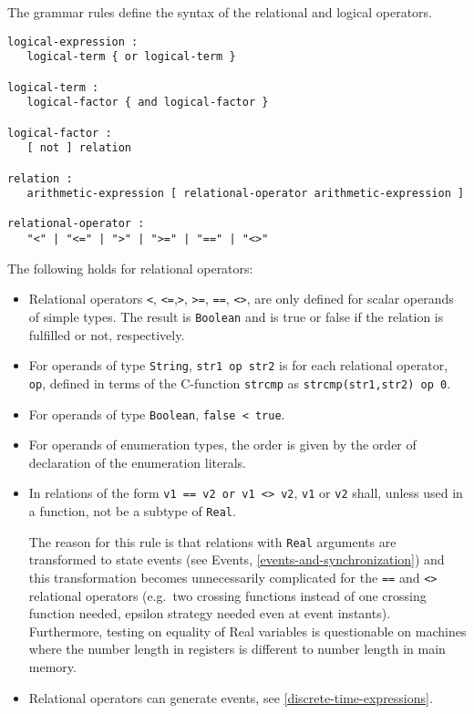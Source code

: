 The grammar rules define the syntax of the relational and logical
operators.

\begin{lstlisting}[language=grammar]
logical-expression :
   logical-term { or logical-term }

logical-term :
   logical-factor { and logical-factor }

logical-factor :
   [ not ] relation

relation :
   arithmetic-expression [ relational-operator arithmetic-expression ]

relational-operator :
   "<" | "<=" | ">" | ">=" | "==" | "<>"
\end{lstlisting}

The following holds for relational operators:
\begin{itemize}
\item
  Relational operators \lstinline!<!, \lstinline!<=!,\lstinline!>!,
\lstinline!>=!, \lstinline!==!, \lstinline!<>!, are only defined for
  scalar operands of simple types. The result is \lstinline!Boolean! and is true or
  false if the relation is fulfilled or not, respectively.
\item
  For operands of type \lstinline!String!, \lstinline!str1 op str2! is for each relational
  operator, \lstinline!op!, defined in terms of the C-function \lstinline!strcmp! as
  \lstinline!strcmp(str1,str2) op 0!.
\item
  For operands of type \lstinline!Boolean!, \lstinline!false < true!.
\item
  For operands of enumeration types, the order is given by the order of
  declaration of the enumeration literals.
\item
  In relations of the form \lstinline!v1 == v2 or v1 <> v2!,
  \lstinline!v1! or \lstinline!v2! shall, unless used in a function, not be a subtype of \lstinline!Real!.
  \begin{nonnormative}
  The reason for this rule is that relations with \lstinline!Real! arguments are transformed to state events (see Events, \autoref{events-and-synchronization})
  and this transformation becomes unnecessarily complicated for the \lstinline!==! and \lstinline!<>! relational operators (e.g.\ two crossing functions instead
  of one crossing function needed, epsilon strategy needed even at event instants). Furthermore, testing on equality of Real variables is questionable on machines
  where the number length in registers is different to number length in main memory.
  \end{nonnormative}
\item
  Relational operators can generate events, see \autoref{discrete-time-expressions}.
\end{itemize}

